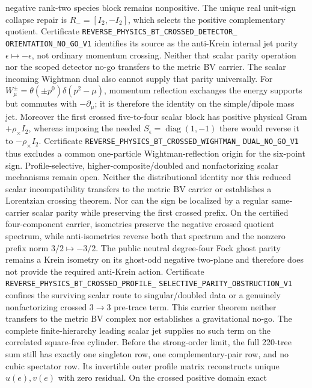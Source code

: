 \documentclass[11pt]{article}
\theoremstyle{definition}
\theoremstyle{remark}
\begin{document}
negative rank-two species block remains nonpositive.  The unique real
unit-sign collapse repair is $R_-=[I_2,-I_2]$, which selects the positive
complementary quotient.  Certificate
\texttt{REVERSE\_PHYSICS\_BT\_CROSSED\_DETECTOR\_}
\allowbreak\texttt{ORIENTATION\_NO\_GO\_V1}
identifies its source as the anti-Krein internal jet parity
$\epsilon\mapsto-\epsilon$, not ordinary momentum crossing.  Neither that
scalar parity operation nor the scoped detector no-go transfers to the
metric BV carrier.
The scalar incoming Wightman dual also cannot supply that parity universally.
For $W_\mu^\pm=\theta(\pm p^0)\delta(p^2-\mu)$, momentum reflection exchanges
the energy supports but commutes with $-\partial_\mu$; it is therefore the
identity on the simple/dipole mass jet.  Moreover the first crossed
five-to-four scalar block has positive physical Gram $+\rho_\times I_2$,
whereas imposing the needed $S_\epsilon=\operatorname{diag}(1,-1)$ there
would reverse it to $-\rho_\times I_2$.  Certificate
\texttt{REVERSE\_PHYSICS\_BT\_CROSSED\_WIGHTMAN\_}
\allowbreak\texttt{DUAL\_NO\_GO\_V1}
thus excludes a common one-particle Wightman-reflection origin for the
six-point sign.  Profile-selective, higher-composite/doubled and
nonfactorizing scalar mechanisms remain open.  Neither the distributional
identity nor this reduced scalar incompatibility transfers to the metric BV
carrier or establishes a Lorentzian crossing theorem.
Nor can the sign be localized by a regular same-carrier scalar parity while
preserving the first crossed prefix.  On the certified four-component carrier,
isometries preserve the negative crossed quotient spectrum, while
anti-isometries reverse both that spectrum and the nonzero prefix norm
$3/2\mapsto-3/2$.  The public neutral degree-four Fock ghost parity remains a
Krein isometry on its ghost-odd negative two-plane and therefore does not
provide the required anti-Krein action.  Certificate
\texttt{REVERSE\_PHYSICS\_BT\_CROSSED\_PROFILE\_}
\allowbreak\texttt{SELECTIVE\_PARITY\_OBSTRUCTION\_V1}
confines the surviving scalar route to singular/doubled data or a genuinely
nonfactorizing crossed $3\to3$ pre-trace term.  This carrier theorem neither
transfers to the metric BV complex nor establishes a gravitational no-go.
The complete finite-hierarchy leading scalar jet supplies no such term on the
correlated square-free cylinder.  Before the strong-order limit, the full
220-tree sum still has exactly one singleton row, one complementary-pair row,
and no cubic spectator row.  Its invertible outer profile matrix reconstructs
unique $u(e),v(e)$ with zero residual.  On the crossed positive domain exact
\end{document}
